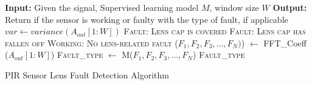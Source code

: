 \renewcommand\algorithmiccomment[1]{%
{\it /* {#1} */} %
}
\renewcommand{\algorithmicrequire}{\textbf{Input: }}
\renewcommand{\algorithmicensure}{\textbf{Output: }}
\renewcommand{\algorithmicforall}{\textbf{for each}}
\begin{algorithm}%
\footnotesize
	\begin{algorithmic}[1]
	        \STATE \algorithmicrequire{Given the \aout signal, Supervised learning model $M$, window size $W$}
	        \STATE \algorithmicensure{Return if the sensor is working or faulty with the type of fault, if applicable}
                \STATE  {}
                \STATE $var \gets variance (A_{out}[1:W])$
                    \RETURN \textsc{Fault: Lens cap is covered}
                    \RETURN \textsc{Fault: Lens cap has fallen off}
                \ELSE
                    \RETURN \textsc{Working: No lens-related fault}
                \ENDIF
            \ELSE
                \STATE {}
                \STATE ($F_1, F_2, F_3, \ldots, F_{N})$) $\gets$ FFT\_Coeff ($A_{out}[1:W]$)
                \STATE \textsc{Fault\_type} $\gets$ M($F_1, F_2, F_3, \ldots, F_{N}$)
                \RETURN \textsc{Fault\_type}
            \ENDIF
    \end{algorithmic}
\caption{PIR Sensor Lens Fault Detection Algorithm}
\label{alg:fault_detection}
\end{algorithm}